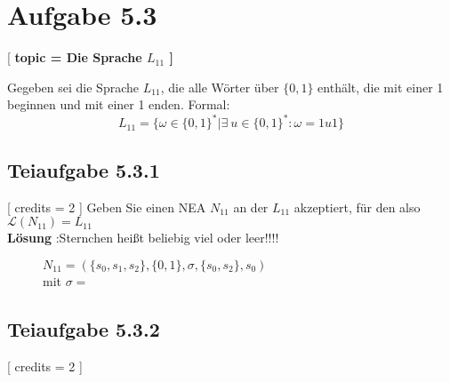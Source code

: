 \documentclass[12pt]{article}
\begin{document}
 \section*{Aufgabe 5.3}[ 
\textbf{ topic = Die Sprache $L_{11}$ 
 ]} 
  
 Gegeben sei die Sprache $L_{11}$, die alle Wörter über $\{0, 1\}$ enthält, die mit einer 1 beginnen und mit einer 1 
 enden. Formal:  
 \[ 
 L_{11} = \{\omega \in \{0, 1\}^* | \exists \ u \in \{0, 1\}^* : \omega = 1u1 \} 
 \] 
  
 \subsection*{Teiaufgabe 5.3.1} [
 credits = 2 
 ] 
 Geben Sie einen NEA $N_{11}$ an der $L_{11}$ akzeptiert, für den also $\mathcal{L}(N_{11}) = L_{11}$ \\
 \textbf{Lösung} :Sternchen heißt beliebig viel oder leer!!!!\\ 
   
 \begin{figure}[h] 
   $N_{11} = (\{s_0,s_1,s_2\},\{0,1\},\sigma,\{s_0,s_2\},s_0)$ \\ mit $\sigma =$ \\

 \centering 
  
 \end{figure} 
  
  
  
  
 \subsection*{Teiaufgabe 5.3.2} [
 credits = 2 
 ] 
  
\end{document}
